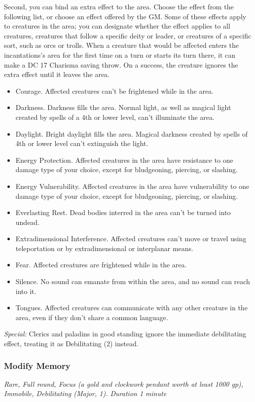 Second, you can bind an extra effect to the area. Choose the effect from the following list, or choose an effect offered by the GM. Some of these effects apply to creatures in the area; you can designate whether the effect applies to all creatures, creatures that follow a specific deity or leader, or creatures of a specific sort, such as orcs or trolls. When a creature that would be affected enters the incantations's area for the first time on a turn or starts its turn there, it can make a DC 17 Charisma saving throw. On a success, the creature ignores the extra effect until it leaves the area.
\begin{itemize}
\item Courage. Affected creatures can't be frightened while in the area.
\item Darkness. Darkness fills the area. Normal light, as well as magical light created by spells of a 4th or lower level, can't illuminate the area.
\item Daylight. Bright daylight fills the area. Magical darkness created by spells of 4th or lower level can't extinguish the light.
\item Energy Protection. Affected creatures in the area have resistance to one damage type of your choice, except for bludgeoning, piercing, or slashing.
\item Energy Vulnerability. Affected creatures in the area have vulnerability to one damage type of your choice, except for bludgeoning, piercing, or slashing.
\item Everlasting Rest. Dead bodies interred in the area can't be turned into undead.
\item Extradimensional Interference. Affected creatures can't move or travel using teleportation or by extradimensional or interplanar means.
\item Fear. Affected creatures are frightened while in the area.
\item Silence. No sound can emanate from within the area, and no sound can reach into it.
\item Tongues. Affected creatures can communicate with any other creature in the area, even if they don't share a common language.
\end{itemize}

\textit{Special:} Clerics and paladins in good standing ignore the immediate debilitating effect, treating it as Debilitating (2) instead.

\subsubsection{Modify Memory}
\textit{Rare, Full round, Focus (a gold and clockwork pendant worth at least 1000 gp), Immobile, Debilitating (Major, 1). Duration 1 minute}

